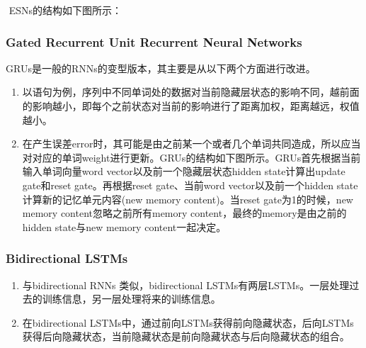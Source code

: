 ​ ESNs的结构如下图所示：


\subsubsection{ Gated Recurrent Unit Recurrent Neural Networks}\label{gated-recurrent-unit-recurrent-neural-networks}

GRUs是一般的RNNs的变型版本，其主要是从以下两个方面进行改进。

\begin{enumerate}
\def\labelenumi{\arabic{enumi}.}
\item
  以语句为例，序列中不同单词处的数据对当前隐藏层状态的影响不同，越前面的影响越小，即每个之前状态对当前的影响进行了距离加权，距离越远，权值越小。
\item
  在产生误差error时，其可能是由之前某一个或者几个单词共同造成，所以应当对对应的单词weight进行更新。GRUs的结构如下图所示。GRUs首先根据当前输入单词向量word
  vector以及前一个隐藏层状态hidden state计算出update gate和reset
  gate。再根据reset gate、当前word vector以及前一个hidden
  state计算新的记忆单元内容(new memory content)。当reset
  gate为1的时候，new memory content忽略之前所有memory
  content，最终的memory是由之前的hidden state与new memory
  content一起决定。
\end{enumerate}


\subsubsection{ Bidirectional LSTMs}\label{bidirectional-lstms}

\begin{enumerate}
\def\labelenumi{\arabic{enumi}.}
\item
  与bidirectional RNNs 类似，bidirectional
  LSTMs有两层LSTMs。一层处理过去的训练信息，另一层处理将来的训练信息。
\item
  在bidirectional
  LSTMs中，通过前向LSTMs获得前向隐藏状态，后向LSTMs获得后向隐藏状态，当前隐藏状态是前向隐藏状态与后向隐藏状态的组合。
\end{enumerate}

